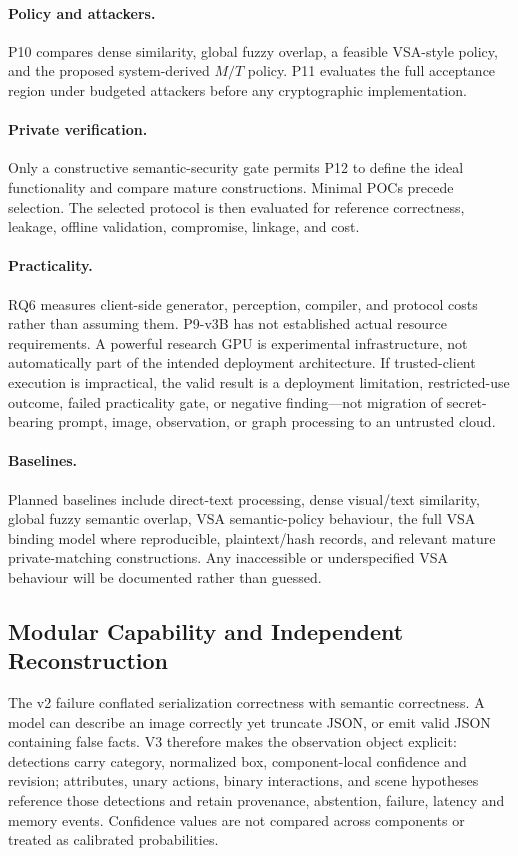 \documentclass[compsoc,conference,a4paper,10pt,times]{IEEEtran}
\begin{document}
\paragraph{Policy and attackers.} P10 compares dense similarity, global fuzzy overlap, a feasible VSA-style policy, and the proposed system-derived $M/T$ policy. P11 evaluates the full acceptance region under budgeted attackers before any cryptographic implementation.

\paragraph{Private verification.} Only a constructive semantic-security gate permits P12 to define the ideal functionality and compare mature constructions. Minimal POCs precede selection. The selected protocol is then evaluated for reference correctness, leakage, offline validation, compromise, linkage, and cost.

\paragraph{Practicality.} RQ6 measures client-side generator, perception, compiler, and protocol costs rather than assuming them. P9-v3B has not established actual resource requirements. A powerful research GPU is experimental infrastructure, not automatically part of the intended deployment architecture. If trusted-client execution is impractical, the valid result is a deployment limitation, restricted-use outcome, failed practicality gate, or negative finding---not migration of secret-bearing prompt, image, observation, or graph processing to an untrusted cloud.

\paragraph{Baselines.} Planned baselines include direct-text processing, dense visual/text similarity, global fuzzy semantic overlap, VSA semantic-policy behaviour, the full VSA binding model where reproducible, plaintext/hash records, and relevant mature private-matching constructions. Any inaccessible or underspecified VSA behaviour will be documented rather than guessed.

\subsection{Modular Capability and Independent Reconstruction}
The v2 failure conflated serialization correctness with semantic correctness. A model can describe an image correctly yet truncate JSON, or emit valid JSON containing false facts. V3 therefore makes the observation object explicit: detections carry category, normalized box, component-local confidence and revision; attributes, unary actions, binary interactions, and scene hypotheses reference those detections and retain provenance, abstention, failure, latency and memory events. Confidence values are not compared across components or treated as calibrated probabilities.
\end{document}
